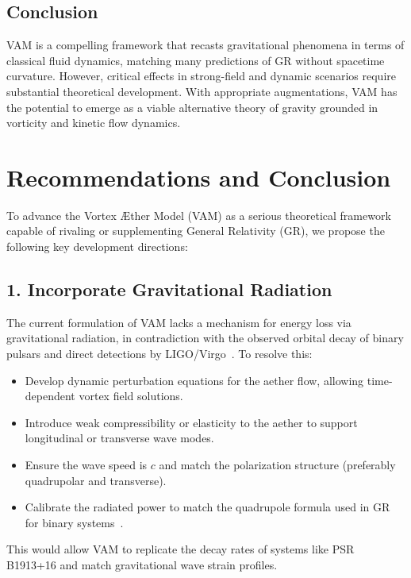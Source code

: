 \subsection*{Conclusion}

VAM is a compelling framework that recasts gravitational phenomena in terms of classical fluid dynamics, matching many predictions of GR without spacetime curvature. However, critical effects in strong-field and dynamic scenarios require substantial theoretical development. With appropriate augmentations, VAM has the potential to emerge as a viable alternative theory of gravity grounded in vorticity and kinetic flow dynamics.

\section{Recommendations and Conclusion}

To advance the Vortex \AE ther Model (VAM) as a serious theoretical framework capable of rivaling or supplementing General Relativity (GR), we propose the following key development directions:

\subsection*{1. Incorporate Gravitational Radiation}

The current formulation of VAM lacks a mechanism for energy loss via gravitational radiation, in contradiction with the observed orbital decay of binary pulsars and direct detections by LIGO/Virgo~\cite{abbott2016}. To resolve this:

\begin{itemize}
    \item Develop dynamic perturbation equations for the aether flow, allowing time-dependent vortex field solutions.
    \item Introduce weak compressibility or elasticity to the aether to support longitudinal or transverse wave modes.
    \item Ensure the wave speed is $c$ and match the polarization structure (preferably quadrupolar and transverse).
    \item Calibrate the radiated power to match the quadrupole formula used in GR for binary systems~\cite{weisberg2016}.
\end{itemize}

This would allow VAM to replicate the decay rates of systems like PSR B1913+16 and match gravitational wave strain profiles.

